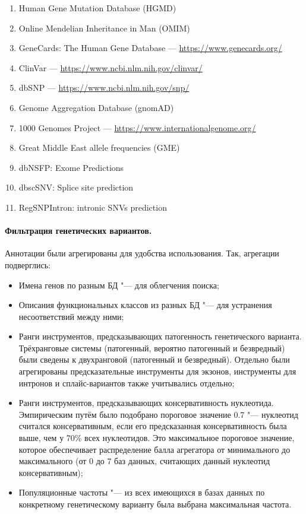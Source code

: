 \documentclass[a4paper,12pt]{article}
\begin{document}
\begin{enumerate}
\item Human Gene Mutation Database (HGMD\textregistered)\cite{Stenson_2017}
\item Online Mendelian Inheritance in Man (OMIM\textregistered)\cite{Amberger_2014}
\item GeneCards\textregistered: The Human Gene Database --- \href{https://www.genecards.org/}{https://www.genecards.org/}
\item ClinVar --- \href{https://www.ncbi.nlm.nih.gov/clinvar/}{https://www.ncbi.nlm.nih.gov/clinvar/}
\item dbSNP --- \href{https://www.ncbi.nlm.nih.gov/snp/}{https://www.ncbi.nlm.nih.gov/snp/}
\item Genome Aggregation Database (gnomAD)\cite{Karczewski_2020}
\item 1000 Genomes Project --- \href{https://www.internationalgenome.org/}{https://www.internationalgenome.org/}
\item Great Middle East allele frequencies (GME)\cite{Scott_2016}
\item dbNSFP: Exome Predictions\cite{Liu_2016}
\item dbscSNV: Splice site prediction\cite{Jian_2013}
\item RegSNPIntron: intronic SNVs prediction\cite{Lin_2019}
\end{enumerate}

\paragraph{Фильтрация генетических вариантов.}
Аннотации были агрегированы для удобства использования.
Так, агрегации подверглись:

\begin{itemize}
\item Имена генов по разным БД "--- для облегчения поиска;
\item Описания функциональных классов из разных БД "--- для устранения несоответствий между ними;
\item Ранги инструментов, предсказывающих патогенность генетического варианта.
Трёхранговые системы (патогенный, вероятно патогенный и безвредный) были сведены к двухранговой (патогенный и безвредный).
Отдельно были агрегированы предсказательные инструменты для экзонов, инструменты для интронов и сплайс-вариантов также учитывались отдельно;
\item Ранги инструментов, предсказывающих консервативность нуклеотида.
Эмпирическим путём было подобрано пороговое значение 0.7 "--- нуклеотид считался консервативным, если его предсказанная консервативность была выше, чем у 70\% всех нуклеотидов.
Это максимальное пороговое значение, которое обеспечивает распределение балла агрегатора от минимального до максимального (от 0 до 7 баз данных, считающих данный нуклеотид консервативным);
\item Популяционные частоты "--- из всех имеющихся в базах данных по конкретному генетическому варианту была выбрана максимальная частота.
\end{itemize}
\end{document}
